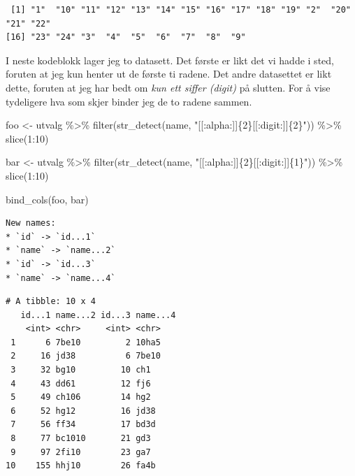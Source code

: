 \documentclass[
  letterpaper,
  DIV=11,
  numbers=noendperiod]{scrreprt}
\newenvironment{Shaded}{\begin{snugshade}}{\end{snugshade}}
\newcommand{\DecValTok}[1]{\textcolor[rgb]{0.68,0.00,0.00}{#1}}
\newcommand{\FunctionTok}[1]{\textcolor[rgb]{0.28,0.35,0.67}{#1}}
\newcommand{\NormalTok}[1]{\textcolor[rgb]{0.00,0.23,0.31}{#1}}
\newcommand{\OtherTok}[1]{\textcolor[rgb]{0.00,0.23,0.31}{#1}}
\newcommand{\SpecialCharTok}[1]{\textcolor[rgb]{0.37,0.37,0.37}{#1}}
\newcommand{\StringTok}[1]{\textcolor[rgb]{0.13,0.47,0.30}{#1}}
\begin{document}
\begin{verbatim}
 [1] "1"  "10" "11" "12" "13" "14" "15" "16" "17" "18" "19" "2"  "20" "21" "22"
[16] "23" "24" "3"  "4"  "5"  "6"  "7"  "8"  "9" 
\end{verbatim}

I neste kodeblokk lager jeg to datasett. Det første er likt det vi hadde
i sted, foruten at jeg kun henter ut de første ti radene. Det andre
datasettet er likt dette, foruten at jeg har bedt om \emph{kun ett
siffer (digit)} på slutten. For å vise tydeligere hva som skjer binder
jeg de to radene sammen.

\begin{Shaded}
\begin{Highlighting}[]
\NormalTok{foo }\OtherTok{\textless{}{-}}\NormalTok{ utvalg }\SpecialCharTok{\%\textgreater{}\%} 
  \FunctionTok{filter}\NormalTok{(}\FunctionTok{str\_detect}\NormalTok{(name, }\StringTok{"[[:alpha:]]\{2\}[[:digit:]]\{2\}"}\NormalTok{)) }\SpecialCharTok{\%\textgreater{}\%} 
  \FunctionTok{slice}\NormalTok{(}\DecValTok{1}\SpecialCharTok{:}\DecValTok{10}\NormalTok{)}

\NormalTok{bar }\OtherTok{\textless{}{-}}\NormalTok{ utvalg }\SpecialCharTok{\%\textgreater{}\%} 
  \FunctionTok{filter}\NormalTok{(}\FunctionTok{str\_detect}\NormalTok{(name, }\StringTok{"[[:alpha:]]\{2\}[[:digit:]]\{1\}"}\NormalTok{)) }\SpecialCharTok{\%\textgreater{}\%} 
  \FunctionTok{slice}\NormalTok{(}\DecValTok{1}\SpecialCharTok{:}\DecValTok{10}\NormalTok{)}

\FunctionTok{bind\_cols}\NormalTok{(foo, bar)}
\end{Highlighting}
\end{Shaded}

\begin{verbatim}
New names:
* `id` -> `id...1`
* `name` -> `name...2`
* `id` -> `id...3`
* `name` -> `name...4`
\end{verbatim}

\begin{verbatim}
# A tibble: 10 x 4
   id...1 name...2 id...3 name...4
    <int> <chr>     <int> <chr>   
 1      6 7be10         2 10ha5   
 2     16 jd38          6 7be10   
 3     32 bg10         10 ch1     
 4     43 dd61         12 fj6     
 5     49 ch106        14 hg2     
 6     52 hg12         16 jd38    
 7     56 ff34         17 bd3d    
 8     77 bc1010       21 gd3     
 9     97 2fi10        23 ga7     
10    155 hhj10        26 fa4b    
\end{verbatim}
\end{document}
